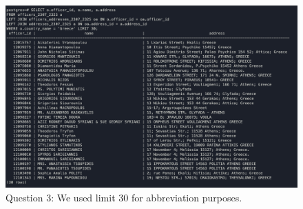 \documentclass{article}
\begin{document}
\begin{figure}[h]
    \centering
    \includegraphics[width=1\linewidth]{Q3.png}
    \captionsetup{labelformat=empty}
    \caption{Question 3: We used limit 30 for abbreviation purposes.}
\end{figure}

\newpage
\end{document}

